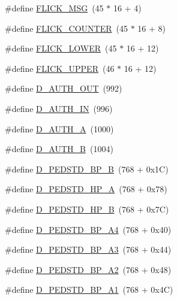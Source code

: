 \begin{DoxyCompactItemize}
\item 
\#define \hyperlink{group___d_r_i_v_e_r_s_ga045a0c3dbfc3523917e914681f437c3f}{F\+L\+I\+C\+K\+\_\+\+M\+SG}~(45 $\ast$ 16 + 4)
\item 
\#define \hyperlink{group___d_r_i_v_e_r_s_gae0cb172ae789a96d344d5dd008aca254}{F\+L\+I\+C\+K\+\_\+\+C\+O\+U\+N\+T\+ER}~(45 $\ast$ 16 + 8)
\item 
\#define \hyperlink{group___d_r_i_v_e_r_s_ga2e56bca3c291c9a618b572307216ec1d}{F\+L\+I\+C\+K\+\_\+\+L\+O\+W\+ER}~(45 $\ast$ 16 + 12)
\item 
\#define \hyperlink{group___d_r_i_v_e_r_s_gadf0738d3c6f0096ecb157aa2b296f1e1}{F\+L\+I\+C\+K\+\_\+\+U\+P\+P\+ER}~(46 $\ast$ 16 + 12)
\item 
\#define \hyperlink{group___d_r_i_v_e_r_s_gafcd825024b1b4f2dd4570e897c3fe24e}{D\+\_\+\+A\+U\+T\+H\+\_\+\+O\+UT}~(992)
\item 
\#define \hyperlink{group___d_r_i_v_e_r_s_gad59a17a973be28ebc0d0bc3ae1e3316f}{D\+\_\+\+A\+U\+T\+H\+\_\+\+IN}~(996)
\item 
\#define \hyperlink{group___d_r_i_v_e_r_s_gaf2eaee2b8c50adbd556a815d7ab795e9}{D\+\_\+\+A\+U\+T\+H\+\_\+A}~(1000)
\item 
\#define \hyperlink{group___d_r_i_v_e_r_s_ga7ee552ff37e87403b24788c2b8e80ce6}{D\+\_\+\+A\+U\+T\+H\+\_\+B}~(1004)
\item 
\#define \hyperlink{group___d_r_i_v_e_r_s_ga2c2d27ad76c61cf19da3460f810eefb1}{D\+\_\+\+P\+E\+D\+S\+T\+D\+\_\+\+B\+P\+\_\+B}~(768 + 0x1\+C)
\item 
\#define \hyperlink{group___d_r_i_v_e_r_s_ga14795bbdfea8a4d5961d2e0d0affe162}{D\+\_\+\+P\+E\+D\+S\+T\+D\+\_\+\+H\+P\+\_\+A}~(768 + 0x78)
\item 
\#define \hyperlink{group___d_r_i_v_e_r_s_ga36c0d5ca76fbb5df31ec8ca0a26db835}{D\+\_\+\+P\+E\+D\+S\+T\+D\+\_\+\+H\+P\+\_\+B}~(768 + 0x7\+C)
\item 
\#define \hyperlink{group___d_r_i_v_e_r_s_gac2bece455bcecb189a347b6c0edf2b6f}{D\+\_\+\+P\+E\+D\+S\+T\+D\+\_\+\+B\+P\+\_\+\+A4}~(768 + 0x40)
\item 
\#define \hyperlink{group___d_r_i_v_e_r_s_ga41557d8ab6be78f157aa4770d5123235}{D\+\_\+\+P\+E\+D\+S\+T\+D\+\_\+\+B\+P\+\_\+\+A3}~(768 + 0x44)
\item 
\#define \hyperlink{group___d_r_i_v_e_r_s_ga000da9f0c92ec1a103f8e1c50e7e61fd}{D\+\_\+\+P\+E\+D\+S\+T\+D\+\_\+\+B\+P\+\_\+\+A2}~(768 + 0x48)
\item 
\#define \hyperlink{group___d_r_i_v_e_r_s_ga6c42f0b2097fe55659dc5ec653681d50}{D\+\_\+\+P\+E\+D\+S\+T\+D\+\_\+\+B\+P\+\_\+\+A1}~(768 + 0x4\+C)

\end{DoxyCompactItemize}
